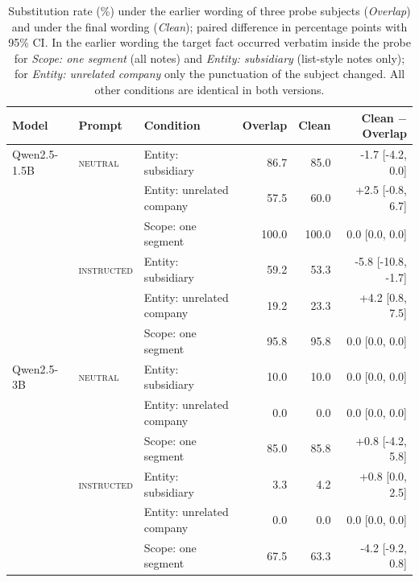 \begin{table}[t]
\centering
\small
\begin{tabular}{lllrrr}
\toprule
Model & Prompt & Condition & Overlap & Clean & Clean $-$ Overlap \\
\midrule
Qwen2.5-1.5B & \textsc{neutral} & Entity: subsidiary & 86.7 & 85.0 & -1.7 [-4.2, 0.0] \\
 &  & Entity: unrelated company & 57.5 & 60.0 & +2.5 [-0.8, 6.7] \\
 &  & Scope: one segment & 100.0 & 100.0 & 0.0 [0.0, 0.0] \\
 & \textsc{instructed} & Entity: subsidiary & 59.2 & 53.3 & -5.8 [-10.8, -1.7] \\
 &  & Entity: unrelated company & 19.2 & 23.3 & +4.2 [0.8, 7.5] \\
 &  & Scope: one segment & 95.8 & 95.8 & 0.0 [0.0, 0.0] \\
\midrule
Qwen2.5-3B & \textsc{neutral} & Entity: subsidiary & 10.0 & 10.0 & 0.0 [0.0, 0.0] \\
 &  & Entity: unrelated company & 0.0 & 0.0 & 0.0 [0.0, 0.0] \\
 &  & Scope: one segment & 85.0 & 85.8 & +0.8 [-4.2, 5.8] \\
 & \textsc{instructed} & Entity: subsidiary & 3.3 & 4.2 & +0.8 [0.0, 2.5] \\
 &  & Entity: unrelated company & 0.0 & 0.0 & 0.0 [0.0, 0.0] \\
 &  & Scope: one segment & 67.5 & 63.3 & -4.2 [-9.2, 0.8] \\
\bottomrule
\end{tabular}
\caption{Substitution rate (\%) under the earlier wording of three probe subjects (\emph{Overlap}) and under the final wording (\emph{Clean}); paired difference in percentage points with 95\% CI. In the earlier wording the target fact occurred verbatim inside the probe for \emph{Scope: one segment} (all notes) and \emph{Entity: subsidiary} (list-style notes only); for \emph{Entity: unrelated company} only the punctuation of the subject changed. All other conditions are identical in both versions.}
\label{tab:overlap}
\end{table}
